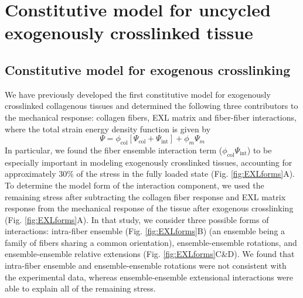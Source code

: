

\section{Constitutive model for uncycled exogenously crosslinked tissue}


\subsection{Constitutive model for exogenous crosslinking}

	We have previously developed the first constitutive model for exogenously crosslinked collagenous tissues \cite{sacks_novel_2015} and determined the following three contributors to the mechanical response: collagen fibers, EXL matrix and fiber-fiber interactions, where the total strain energy density function is given by
\begin{equation} \label{eq:totalstrainenergy}
    \Psi = \phi_\mathrm{col} \left[ \Psi_\mathrm{col} + \Psi_\mathrm{int}\right] + \phi_m \Psi_m
\end{equation}
	In particular, we found the fiber ensemble interaction term ($\phi_\mathrm{col} \Psi_\mathrm{int}$) to be especially important in modeling exogenously crosslinked tissues, accounting for approximately 30\% of the stress in the fully loaded state (Fig. \ref{fig:EXLforms}A). To determine the model form of the interaction component, we used the remaining stress after subtracting the collagen fiber response and EXL matrix response from the mechanical response of the tissue after exogenous crosslinking (Fig. \ref{fig:EXLforms}A). In that study, we consider three possible forms of interactions: intra-fiber ensemble (Fig. \ref{fig:EXLforms}B) (an ensemble being a family of fibers sharing a common orientation), ensemble-ensemble rotations, and ensemble-ensemble relative extensions (Fig. \ref{fig:EXLforms}C\&D). We found that intra-fiber ensemble and ensemble-ensemble rotations were not consistent with the experimental data, whereas ensemble-ensemble extensional interactions were able to explain all of the remaining stress. 
	
